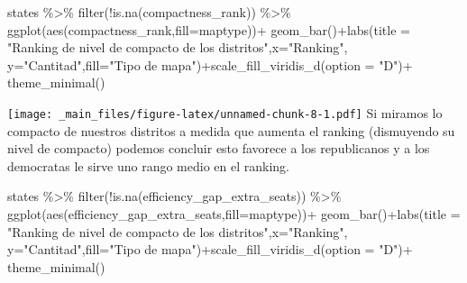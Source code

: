 \documentclass[
]{book}
\newenvironment{Shaded}{\begin{snugshade}}{\end{snugshade}}
\newcommand{\AttributeTok}[1]{\textcolor[rgb]{0.77,0.63,0.00}{#1}}
\newcommand{\FunctionTok}[1]{\textcolor[rgb]{0.00,0.00,0.00}{#1}}
\newcommand{\NormalTok}[1]{#1}
\newcommand{\OtherTok}[1]{\textcolor[rgb]{0.56,0.35,0.01}{#1}}
\newcommand{\SpecialCharTok}[1]{\textcolor[rgb]{0.00,0.00,0.00}{#1}}
\newcommand{\StringTok}[1]{\textcolor[rgb]{0.31,0.60,0.02}{#1}}
\begin{document}
\begin{Shaded}
\end{Shaded}

\begin{Shaded}
\begin{Highlighting}[]
\NormalTok{states }\SpecialCharTok{\%\textgreater{}\%}
  \FunctionTok{filter}\NormalTok{(}\SpecialCharTok{!}\FunctionTok{is.na}\NormalTok{(compactness\_rank)) }\SpecialCharTok{\%\textgreater{}\%} 
\FunctionTok{ggplot}\NormalTok{(}\FunctionTok{aes}\NormalTok{(compactness\_rank,}\AttributeTok{fill=}\NormalTok{maptype))}\SpecialCharTok{+}
  \FunctionTok{geom\_bar}\NormalTok{()}\SpecialCharTok{+}\FunctionTok{labs}\NormalTok{(}\AttributeTok{title =} \StringTok{"Ranking de nivel de compacto de los distritos"}\NormalTok{,}\AttributeTok{x=}\StringTok{"Ranking"}\NormalTok{,}
                  \AttributeTok{y=}\StringTok{"Cantitad"}\NormalTok{,}\AttributeTok{fill=}\StringTok{"Tipo de mapa"}\NormalTok{)}\SpecialCharTok{+}\FunctionTok{scale\_fill\_viridis\_d}\NormalTok{(}\AttributeTok{option =} \StringTok{"D"}\NormalTok{)}\SpecialCharTok{+}
  \FunctionTok{theme\_minimal}\NormalTok{()}
\end{Highlighting}
\end{Shaded}

\texttt{[image: \_main\_files/figure-latex/unnamed-chunk-8-1.pdf]}
Si miramos lo compacto de nuestros distritos a medida que aumenta el ranking (dismuyendo su nivel de compacto) podemos concluir esto favorece a los republicanos y a los democratas le sirve uno rango medio en el ranking.

\begin{Shaded}
\begin{Highlighting}[]
\NormalTok{states }\SpecialCharTok{\%\textgreater{}\%}
  \FunctionTok{filter}\NormalTok{(}\SpecialCharTok{!}\FunctionTok{is.na}\NormalTok{(efficiency\_gap\_extra\_seats)) }\SpecialCharTok{\%\textgreater{}\%} 
\FunctionTok{ggplot}\NormalTok{(}\FunctionTok{aes}\NormalTok{(efficiency\_gap\_extra\_seats,}\AttributeTok{fill=}\NormalTok{maptype))}\SpecialCharTok{+}
  \FunctionTok{geom\_bar}\NormalTok{()}\SpecialCharTok{+}\FunctionTok{labs}\NormalTok{(}\AttributeTok{title =} \StringTok{"Ranking de nivel de compacto de los distritos"}\NormalTok{,}\AttributeTok{x=}\StringTok{"Ranking"}\NormalTok{,}
                  \AttributeTok{y=}\StringTok{"Cantitad"}\NormalTok{,}\AttributeTok{fill=}\StringTok{"Tipo de mapa"}\NormalTok{)}\SpecialCharTok{+}\FunctionTok{scale\_fill\_viridis\_d}\NormalTok{(}\AttributeTok{option =} \StringTok{"D"}\NormalTok{)}\SpecialCharTok{+}
  \FunctionTok{theme\_minimal}\NormalTok{()}
\end{Highlighting}
\end{Shaded}
\end{document}
